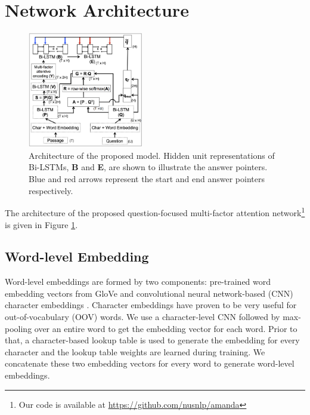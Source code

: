 \documentclass[letterpaper]{article} %
\begin{document}
\section{Network Architecture}
\label{sec:network}
\begin{figure}[t]
\centering
\includegraphics[width=0.45\textwidth]{amandasystem.png}
\caption{Architecture of the proposed model. Hidden unit representations of Bi-LSTMs, \textbf{B} and \textbf{E}, are shown to illustrate the answer pointers. Blue and red arrows represent the start and end answer pointers respectively.}
\label{fig:squad_system_block}
\end{figure}
The architecture of the proposed question-focused multi-factor attention network\footnote{Our code is available at \url{https://github.com/nusnlp/amanda}} 
is given in Figure \ref{fig:squad_system_block}.
\subsection{Word-level Embedding}
Word-level embeddings are formed by two components: pre-trained word embedding vectors from GloVe \cite{pennington2014glove} and convolutional neural network-based (CNN) character embeddings \cite{cnn_char_emb_kim2014}. 
Character embeddings have proven to be very useful for out-of-vocabulary (OOV) words.
We use a character-level CNN followed by max-pooling over an entire word to get the embedding vector for each word. Prior to that, a character-based lookup table is used to generate the embedding for every character and the lookup table weights are learned during training. We concatenate these two embedding vectors for every word to generate word-level embeddings. 
\end{document}
